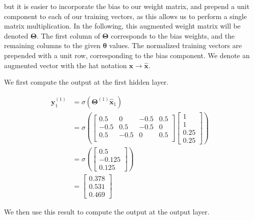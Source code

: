 \documentclass[a4paper, 10pt, twoside]{article}
\begin{document}
\begin{enumerate}[a)]
	      but it is easier to incorporate the bias to our weight matrix, and prepend a unit component to each of our training vectors, as this allows us to perform a single matrix multiplication. In the following, this augmented weight matrix will be denoted $\bm{\Theta}$. The first column of $\bm{\Theta}$ corresponds to the bias weights, and the remaining columns to the given $\bm{\theta}$ values. The normalized training vectors are prepended with a unit row, corresponding to the bias component. We denote an augmented vector with the hat notation $\bm{x} \rightarrow \bm{\hat x}$.

	      We first compute the output at the first hidden layer.

	      \begin{align*}
		      \bm{y}_1^{(1)}
		       & = \sigma\left(\bm{\Theta}^{(1)}\bm{\hat x}_1\right) \\
		       & = \sigma
		      \left(
		      \begin{bmatrix}
				      0.5  & 0    & -0.5 & 0.5 \\
				      -0.5 & 0.5  & -0.5 & 0   \\
				      0.5  & -0.5 & 0    & 0.5 \\
			      \end{bmatrix}
		      \begin{bmatrix}
				      1 \\ 1 \\ 0.25 \\ 0.25
			      \end{bmatrix}
		      \right)                                                \\
		       & = \sigma
		      \left(
		      \begin{bmatrix}
				      0.5 \\ -0.125 \\ 0.125
			      \end{bmatrix}
		      \right)                                                \\
		       & =
		      \begin{bmatrix}
			      0.378 \\ 0.531 \\ 0.469
		      \end{bmatrix}
	      \end{align*}

	      We then use this result to compute the output at the output layer.


\end{enumerate}
\end{document}
